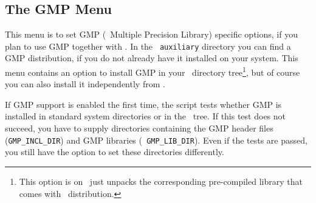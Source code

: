
\subsection{The GMP Menu}\label{sec:gmp-menu}

This menu is to set GMP (\gnu\ Multiple Precision Library) specific
options, if you plan to use GMP together with \cgal . In the {\tt
  auxiliary} directory you can find a GMP distribution, if you do not
already have it installed on your system. This menu contains an option
to install GMP in your \cgal\ directory tree\footnote{This option is
  on \msvc\ just unpacks the corresponding pre-compiled library that
  comes with \cgal\ distribution.}, but of course you can also install
it independently from \cgal .

If GMP support is enabled the first time, the script tests whether GMP
is installed in standard system directories or in the \cgal\ tree. If
this test does not succeed, you have to supply directories containing
the GMP header files (\texttt{GMP\_INCL\_DIR}) and GMP libraries ({\tt
  GMP\_LIB\_DIR}).  Even if the tests are passed, you still have the
option to set these directories differently.\bigskip

